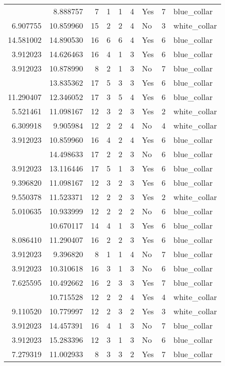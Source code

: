 \documentclass[
]{article}
\begin{document}
\begin{longtable}[t]{rrrrrllrl}
\addlinespace
3.912023 & 8.888757 & 7 & 1 & 1 & 4 & Yes & 7 & blue\_collar\\
6.907755 & 10.859960 & 15 & 2 & 2 & 4 & No & 3 & white\_collar\\
14.581002 & 14.890530 & 16 & 6 & 6 & 4 & Yes & 6 & blue\_collar\\
3.912023 & 14.626463 & 16 & 4 & 1 & 3 & Yes & 6 & blue\_collar\\
3.912023 & 10.878990 & 8 & 2 & 1 & 3 & No & 7 & blue\_collar\\
\addlinespace
10.167773 & 13.835362 & 17 & 5 & 3 & 3 & Yes & 6 & blue\_collar\\
11.290407 & 12.346052 & 17 & 3 & 5 & 4 & Yes & 6 & blue\_collar\\
5.521461 & 11.098167 & 12 & 3 & 2 & 3 & Yes & 2 & white\_collar\\
6.309918 & 9.905984 & 12 & 2 & 2 & 4 & No & 4 & white\_collar\\
3.912023 & 10.859960 & 16 & 4 & 2 & 4 & Yes & 6 & blue\_collar\\
\addlinespace
13.592429 & 14.498633 & 17 & 2 & 2 & 3 & No & 6 & blue\_collar\\
3.912023 & 13.116446 & 17 & 5 & 1 & 3 & Yes & 6 & blue\_collar\\
9.396820 & 11.098167 & 12 & 3 & 2 & 3 & Yes & 6 & blue\_collar\\
9.550378 & 11.523371 & 12 & 2 & 2 & 3 & Yes & 2 & white\_collar\\
5.010635 & 10.933999 & 12 & 2 & 2 & 2 & No & 6 & blue\_collar\\
\addlinespace
3.912023 & 10.670117 & 14 & 4 & 1 & 3 & Yes & 6 & blue\_collar\\
8.086410 & 11.290407 & 16 & 2 & 2 & 3 & Yes & 6 & blue\_collar\\
3.912023 & 9.396820 & 8 & 1 & 1 & 4 & No & 7 & blue\_collar\\
3.912023 & 10.310618 & 16 & 3 & 1 & 3 & No & 6 & blue\_collar\\
7.625595 & 10.492662 & 16 & 2 & 3 & 3 & Yes & 7 & blue\_collar\\
\addlinespace
7.625595 & 10.715528 & 12 & 2 & 2 & 4 & Yes & 4 & white\_collar\\
9.110520 & 10.779997 & 12 & 2 & 3 & 2 & Yes & 3 & white\_collar\\
3.912023 & 14.457391 & 16 & 4 & 1 & 3 & No & 7 & blue\_collar\\
3.912023 & 15.283396 & 12 & 3 & 1 & 3 & No & 6 & blue\_collar\\
7.279319 & 11.002933 & 8 & 3 & 3 & 2 & Yes & 7 & blue\_collar\\

\end{longtable}
\end{document}
